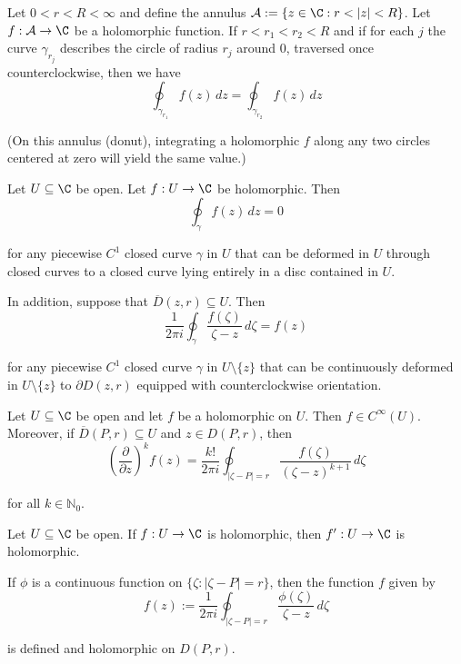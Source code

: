 \label{ecbc559}

Let $0<r<R<\infty$ and define the annulus $\mathcal
	A:=\{z\in\C:r<|z|<R\}$. Let $f:\mathcal A\to\C$ be a holomorphic
function. If $r<r_1<r_2<R$ and if for each $j$ the curve
$\gamma_{r_j}$ describes the circle of radius $r_j$ around 0,
traversed once counterclockwise, then we have
$$
	\oint_{\gamma_{r_1}}f(z)\,dz=\oint_{\gamma_{r_2}}f(z)\,dz
$$

(On this annulus (donut), integrating a holomorphic $f$ along any two
circles centered at zero will yield the same value.)

\label{be5c80c}

Let $U\subseteq\C$ be open. Let $f:U\to\C$ be holomorphic. Then
$$\oint_\gamma f(z)\,dz=0$$

for any piecewise $C^1$ closed curve $\gamma$ in $U$ that can be
deformed in $U$ through closed curves to a closed curve lying entirely
in a disc contained in $U$.

In addition, suppose that $\overline D(z,r)\subseteq U$. Then
$$
	\frac1{2\pi i}\oint_\gamma\frac{f(\zeta)}{\zeta-z}\,d\zeta=f(z)
$$

for any piecewise $C^1$ closed curve $\gamma$ in $U\setminus\{z\}$
that can be continuously deformed in $U\setminus\{z\}$ to $\partial
	D(z,r)$ equipped with counterclockwise orientation.

\label{e20a4ed}

Let $U\subseteq\C$ be open and let $f$ be a holomorphic on $U$. Then
$f\in C^\infty(U)$. Moreover, if $\overline D(P,r)\subseteq U$ and
$z\in D(P,r)$, then
$$
	\left(\frac\partial{\partial z}\right)^kf(z)=\frac{k!}{2\pi i}
	\oint_{|\zeta-P|=r}\frac{f(\zeta)}{(\zeta-z)^{k+1}}\,d\zeta
$$

for all $k\in\mathbb{N}_0$.

\label{ee189cf}

Let $U\subseteq\C$ be open. If $f:U\to\C$ is holomorphic, then
$f':U\to\C$ is holomorphic.

\label{c056da0}

If $\phi$ is a continuous function on $\{\zeta:|\zeta-P|=r\}$, then
the function $f$ given by
$$
	f(z):=\frac1{2\pi i}\oint_{|\zeta-P|=r}\frac{\phi(\zeta)}{\zeta-z}\,d\zeta
$$

is defined and holomorphic on $D(P,r)$.

